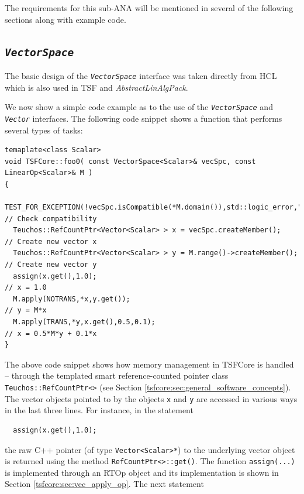 The requirements for this sub-ANA will be mentioned in several of the
following sections along with example code.

%
\subsection{\texttt{\textit{VectorSpace}}}
\label{tsfcore:sec:vec_space}
%

The basic design of the {}\texttt{\textit{VectorSpace}} interface was
taken directly from HCL which is also used in TSF and
{}\textit{AbstractLinAlgPack}.

We now show a simple code example as to the use of the
{}\texttt{\textit{VectorSpace}} and {}\texttt{\textit{Vector}}
interfaces.  The following code snippet shows a function that performs
several types of tasks:

{\scriptsize\begin{verbatim}
temaplate<class Scalar>
void TSFCore::foo0( const VectorSpace<Scalar>& vecSpc, const LinearOp<Scalar>& M )
{
  TEST_FOR_EXCEPTION(!vecSpc.isCompatible(*M.domain()),std::logic_error,"Error!"); // Check compatibility
  Teuchos::RefCountPtr<Vector<Scalar> > x = vecSpc.createMember();                 // Create new vector x
  Teuchos::RefCountPtr<Vector<Scalar> > y = M.range()->createMember();             // Create new vector y
  assign(x.get(),1.0);                                                             // x = 1.0
  M.apply(NOTRANS,*x,y.get());                                                     // y = M*x
  M.apply(TRANS,*y,x.get(),0.5,0.1);                                               // x = 0.5*M*y + 0.1*x
}
\end{verbatim}}

{}\noindent{}The above code snippet shows how memory management in
TSFCore is handled -- through the templated smart reference-counted
pointer class {}\texttt{Teuchos\-::RefCountPtr<>} (see Section
{}\ref{tsfcore:sec:general_software_concepts}).  The vector objects
pointed to by the objects {}\texttt{x} and {}\texttt{y} are accessed
in various ways in the last three lines.  For instance, in the
statement

{\scriptsize\begin{verbatim}
  assign(x.get(),1.0);
\end{verbatim}}

{}\noindent{}the raw C++ pointer (of type {}\texttt{Vector<Scalar>*})
to the underlying vector object is returned using the method
{}\texttt{RefCountPtr<>\-::get()}.  The function
{}\texttt{assign(...)} is implemented through an RTOp object and its
implementation is shown in Section {}\ref{tsfcore:sec:vec_apply_op}.
The next statement

